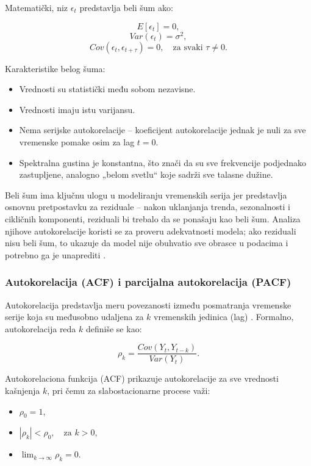 \documentclass[12pt]{article}
\begin{document}
Matematički, niz $\epsilon_t$ predstavlja beli šum ako:

$$
E[\epsilon_t] = 0,
$$
$$
Var(\epsilon_t) = \sigma^2,
$$
$$
Cov(\epsilon_t, \epsilon_{t+\tau}) = 0, \quad \text{za svaki } \tau \neq 0.
$$

Karakteristike belog šuma:

\begin{itemize}
\item Vrednosti su statistički među sobom nezavisne.
\item Vrednosti imaju istu varijansu.
\item Nema serijske autokorelacije – koeficijent autokorelacije jednak je nuli za sve vremenske pomake osim za lag $t=0$.
\item Spektralna gustina je konstantna, što znači da su sve frekvencije podjednako zastupljene, analogno „belom svetlu“ koje sadrži sve talasne dužine.
\end{itemize}

Beli šum ima ključnu ulogu u modeliranju vremenskih serija jer predstavlja osnovnu pretpostavku za reziduale – nakon uklanjanja trenda, sezonalnosti i cikličnih komponenti, reziduali bi trebalo da se ponašaju kao beli šum. Analiza njihove autokorelacije koristi se za proveru adekvatnosti modela; ako reziduali nisu beli šum, to ukazuje da model nije obuhvatio sve obrasce u podacima i potrebno ga je unaprediti \cite{box1970, brockwell2002}.


\subsubsection{Autokorelacija (ACF) i parcijalna autokorelacija (PACF)}

Autokorelacija predstavlja meru povezanosti između posmatranja vremenske serije koja su međusobno udaljena za $k$ vremenskih jedinica (lag) \cite{box1970, brockwell2002}. Formalno, autokorelacija reda $k$ definiše se kao:

\[
\rho_k = \frac{Cov(Y_t, Y_{t-k})}{Var(Y_t)}.
\]

Autokorelaciona funkcija (ACF) prikazuje autokorelacije za sve vrednosti kašnjenja $k$, pri čemu za slabostacionarne procese važi:

\begin{itemize}
    \item $\rho_0 = 1$,
    \item $|\rho_k| < \rho_0, \quad \text{za } k>0$,
    \item $\lim_{k \to \infty} \rho_k = 0$.
\end{itemize}
\end{document}
